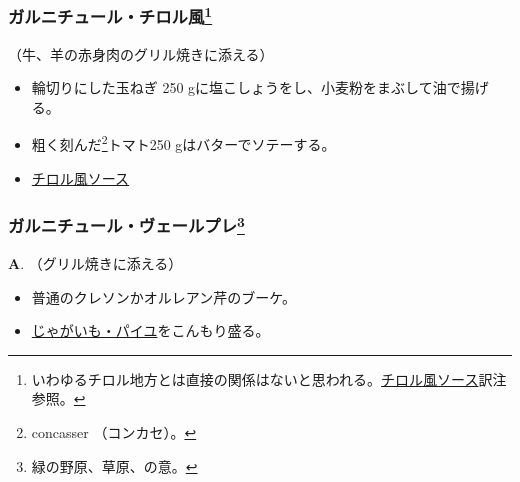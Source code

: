 \begin{recette}
\atoaki{}

\hypertarget{garniture-tyrolienne}{%
\subsubsection[ガルニチュール・チロル風]{\texorpdfstring{ガルニチュール・チロル風\footnote{いわゆるチロル地方とは直接の関係はないと思われる。\protect\hyperlink{sauce-tyrolienne}{チロル風ソース}訳注参照。}}{ガルニチュール・チロル風}}\label{garniture-tyrolienne}}



（牛、羊の赤身肉のグリル焼きに添える）

\begin{itemize}
\item
  輪切りにした玉ねぎ 250 gに塩こしょうをし、小麦粉をまぶして油で揚げる。
\item
  粗く刻んだ\footnote{concasser （コンカセ）。}トマト250
  gはバターでソテーする。
\item
  \protect\hyperlink{sauce-tyrolienne}{チロル風ソース}
\end{itemize}

\atoaki{}

\hypertarget{garniture-vert-pre}{%
\subsubsection[ガルニチュール・ヴェールプレ]{\texorpdfstring{ガルニチュール・ヴェールプレ\footnote{緑の野原、草原、の意。}}{ガルニチュール・ヴェールプレ}}\label{garniture-vert-pre}}



\textbf{A}. （グリル焼きに添える）

\begin{itemize}
\item
  普通のクレソンかオルレアン芹のブーケ。
\item
  \protect\hyperlink{pommes-de-terre-pailles}{じゃがいも・パイユ}をこんもり盛る。
\end{itemize}


\end{recette}
